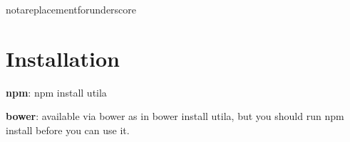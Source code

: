 notareplacementforunderscore

\section*{Installation}

{\bfseries npm}\+: {\ttfamily npm install utila}

{\bfseries bower}\+: available via bower as in {\ttfamily bower install utila}, but you should run {\ttfamily npm install} before you can use it. 